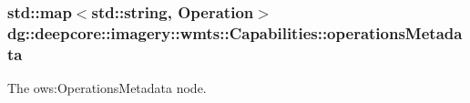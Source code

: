 \subsubsection[{\texorpdfstring{operations\+Metadata}{operationsMetadata}}]{\setlength{\rightskip}{0pt plus 5cm}std\+::map$<$std\+::string, {\bf Operation}$>$ dg\+::deepcore\+::imagery\+::wmts\+::\+Capabilities\+::operations\+Metadata}\hypertarget{structdg_1_1deepcore_1_1imagery_1_1wmts_1_1_capabilities_a8f1483625c85a9ecebec0093ddfc6103}{}\label{structdg_1_1deepcore_1_1imagery_1_1wmts_1_1_capabilities_a8f1483625c85a9ecebec0093ddfc6103}


The ows\+:Operations\+Metadata node. 


